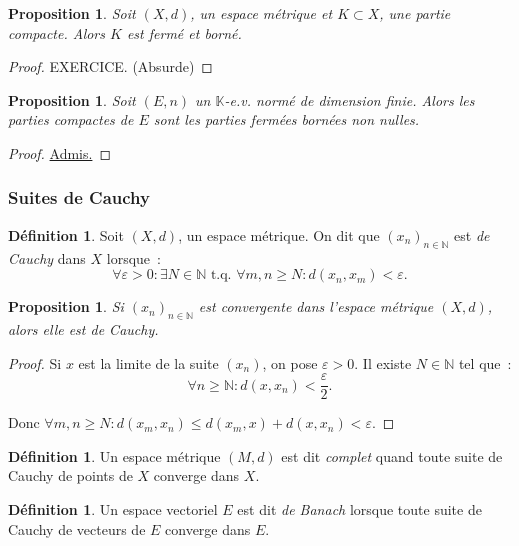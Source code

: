 \documentclass{report}
\newtheorem{prp}[thm]{Proposition}
\theoremstyle{definition}
\newtheorem{déf}[thm]{Définition}
\theoremstyle{remark}
\numberwithin{equation}{section}
\newcommand{\K}{\mathbb K}
\newcommand{\N}{\mathbb N}
\newcommand{\tq}{\text{ t.q. }}
\newcommand{\seq}[3]{\left(#1_{#2}\right)_{#2 \in #3}}
\newcommand{\grantedproof}{\begin{proof} \underline{Admis.} \end{proof}}
\begin{document}
				\begin{prp} Soit $(X, d)$, un espace métrique et $K \subset X$, une partie compacte. Alors $K$ est fermé et borné. \end{prp}

				\begin{proof} EXERCICE. (Absurde)
				\end{proof}

				\begin{prp} Soit $(E, n)$ un $\K$-e.v. normé de dimension finie. Alors les parties compactes de $E$ sont les parties fermées
				bornées non nulles. \end{prp}

				\grantedproof

			\subsubsection{Suites de Cauchy}
				\begin{déf} Soit $(X, d)$, un espace métrique. On dit que $\seq xn\N$ est \textit{de Cauchy} dans $X$ lorsque~:
				\begin{equation}
					\forall \varepsilon > 0 : \exists N \in \N \tq \forall m, n \geq N : d(x_n, x_m) < \varepsilon.
				\end{equation}
				\end{déf}

				\begin{prp} Si $\seq xn\N$ est convergente dans l'espace métrique $(X, d)$, alors elle est de Cauchy. \end{prp}

				\begin{proof} Si $x$ est la limite de la suite $(x_n)$, on pose $\varepsilon > 0$. Il existe $N \in \N$ tel que~:
				\begin{equation}
					\forall n \geq \N : d(x, x_n) < \frac \varepsilon2.
				\end{equation}

				Donc $\forall m, n \geq N : d(x_m, x_n) \leq d(x_m, x) + d(x, x_n) < \varepsilon$.
				\end{proof}

				\begin{déf} Un espace métrique $(M, d)$ est dit \textit{complet} quand toute suite de Cauchy de points de $X$ converge dans $X$. \end{déf}

				\begin{déf} Un espace vectoriel $E$ est dit \textit{de Banach} lorsque toute suite de Cauchy de vecteurs de $E$ converge dans $E$. \end{déf}
\end{document}
